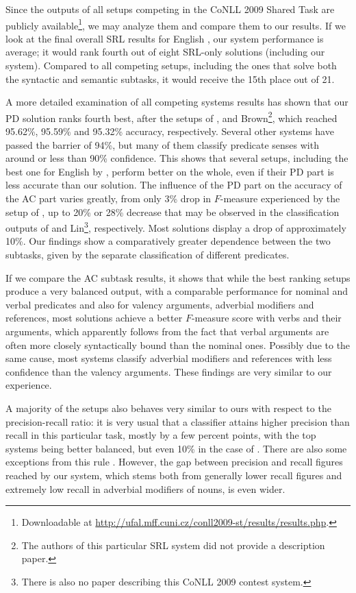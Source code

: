 \documentclass[12pt,notitlepage]{report}
\begin{document}
Since the outputs of all setups competing in the CoNLL 2009 Shared Task are publicly available\footnote{Downloadable at \url{http://ufal.mff.cuni.cz/conll2009-st/results/results.php}.}, we may analyze them and compare them to our results. If we look at the final overall SRL results for English \citep[cf. tables in][]{hajic09}, our system performance is average; it would rank fourth out of eight SRL-only solutions (including our system). Compared to all competing setups, including the ones that solve both the syntactic and semantic subtasks, it would receive the 15th place out of 21.

A more detailed examination of all competing systems results has shown that our PD solution ranks fourth best, after the setups of \citet{tackstrom09}, \citet{nugues09} and Brown\footnote{The authors of this particular SRL system did not provide a description paper.}, which reached 95.62\%, 95.59\% and 95.32\% accuracy, respectively. Several other systems have passed the barrier of 94\%, but many of them classify predicate senses with around or less than 90\% confidence. This shows that several setups, including the best one for English by \citet{chen09}, perform better on the whole, even if their PD part is less accurate than our solution. The influence of the PD part on the accuracy of the AC part varies greatly, from only 3\% drop in $F$-measure experienced by the setup of \citet{li09}, up to 20\% or 28\% decrease that may be observed in the classification outputs of \citet{nugues09} and Lin\footnote{There is also no paper describing this CoNLL 2009 contest system.}, respectively. Most solutions display a drop of approximately 10\%. Our findings show a comparatively greater dependence between the two subtasks, given by the separate classification of different predicates.

If we compare the AC subtask results, it shows that while the best ranking setups \citep{nugues09,zhao09} produce a very balanced output, with a comparable performance for nominal and verbal predicates and also for valency arguments, adverbial modifiers and references, most solutions achieve a better $F$-measure score with verbs and their arguments, which apparently follows from the fact that verbal arguments are often more closely syntactically bound than the nominal ones. Possibly due to the same cause, most systems classify adverbial modifiers and references with less confidence than the valency arguments. These findings are very similar to our experience.

A majority of the setups also behaves very similar to ours with respect to the precision-recall ratio: it is very usual that a classifier attains higher precision than recall in this particular task, mostly by a few percent points, with the top systems being better balanced, but even 10\% in the case of \citet{meza-ruiz09}. There are also some exceptions from this rule \citep{vallejo09}. However, the gap between precision and recall figures reached by our system, which stems both from generally lower recall figures and extremely low recall in adverbial modifiers of nouns, is even wider.
\end{document}

